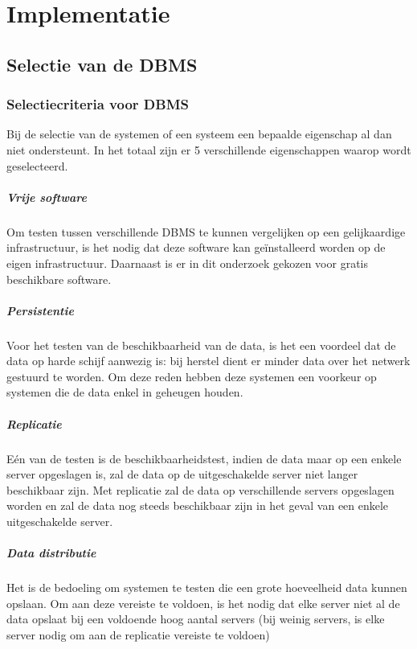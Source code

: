 \chapter{Implementatie}

\section{Selectie van de DBMS}

\subsection{Selectiecriteria voor DBMS}
Bij de selectie van de systemen of een systeem een bepaalde eigenschap al dan niet ondersteunt. In het totaal zijn er 5 verschillende eigenschappen waarop wordt geselecteerd. 

\paragraph{Vrije software} Om testen tussen verschillende DBMS te kunnen vergelijken op een gelijkaardige infrastructuur, is het nodig dat deze software kan geïnstalleerd worden op de eigen infrastructuur. Daarnaast is er in dit onderzoek gekozen voor gratis beschikbare software. 

\paragraph{Persistentie} Voor het testen van de beschikbaarheid van de data, is het een voordeel dat de data op harde schijf aanwezig is: bij herstel dient er minder data over het netwerk gestuurd te worden. Om deze reden hebben deze systemen een voorkeur op systemen die de data enkel in geheugen houden. 

\paragraph{Replicatie} Eén van de testen is de beschikbaarheidstest, indien de data maar op een enkele server opgeslagen is, zal de data op de uitgeschakelde server niet langer beschikbaar zijn. Met replicatie zal de data op verschillende servers opgeslagen worden en zal de data nog steeds beschikbaar zijn in het geval van een enkele uitgeschakelde server. 

\paragraph{Data distributie} Het is de bedoeling om systemen te testen die een grote hoeveelheid data kunnen opslaan. Om aan deze vereiste te voldoen, is het nodig dat elke server niet al de data opslaat bij een voldoende hoog aantal servers (bij weinig servers, is elke server nodig om aan de replicatie vereiste te voldoen)

